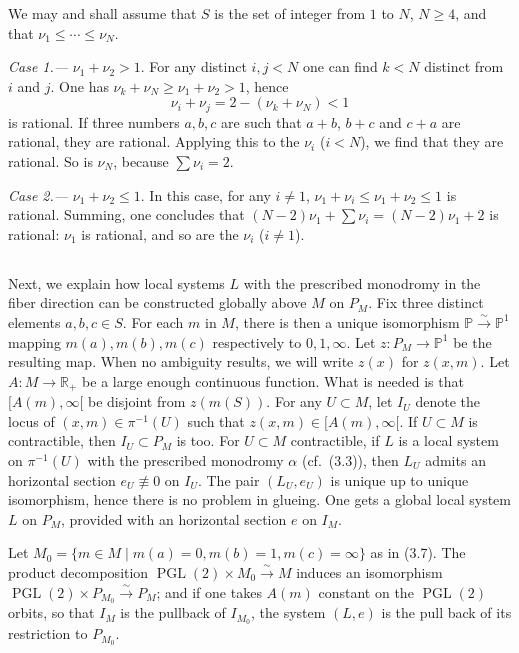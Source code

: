 \documentclass[12pt,a4paper]{article}
\theoremstyle{plain}
\theoremstyle{definition}
\theoremstyle{remark}
\DeclareMathOperator{\PGL}{PGL}
\newcommand{\PP}{\mathbb{P}}
\newcommand{\RR}{\mathbb{R}}
\numberwithin{equation}{section}
\providecommand{\PP}{\mathbb{P}}
\providecommand{\RR}{\mathbb{R}}
\providecommand{\PGL}{\operatorname{PGL}}
\begin{document}
We may and shall assume that $S$ is the set of integer from $1$ to $N$, $N \geq 4$, and that $\nu_1 \leq \cdots \leq \nu_N$.

\textit{Case 1.---} $\nu_1 + \nu_2 > 1$. For any distinct $i, j < N$ one can find $k < N$ distinct from $i$ and $j$. One has $\nu_k + \nu_N \geq \nu_1 + \nu_2 > 1$, hence
\[
\nu_i + \nu_j = 2 - (\nu_k + \nu_N) < 1
\]
is rational. If three numbers $a, b, c$ are such that $a+b$, $b+c$ and $c+a$ are rational, they are rational. Applying this to the $\nu_i$ ($i < N$), we find that they are rational. So is $\nu_N$, because $\sum \nu_i = 2$.

\textit{Case 2.---} $\nu_1 + \nu_2 \leq 1$. In this case, for any $i \neq 1$, $\nu_1 + \nu_i \leq \nu_1 + \nu_2 \leq 1$ is rational. Summing, one concludes that $(N-2)\nu_1 + \sum \nu_i = (N-2)\nu_1 + 2$ is rational: $\nu_1$ is rational, and so are the $\nu_i$ ($i \neq 1$).

\subsection{}
Next, we explain how local systems $L$ with the prescribed monodromy in the fiber direction can be constructed globally above $M$ on $P_M$. Fix three distinct elements $a, b, c \in S$. For each $m$ in $M$, there is then a unique isomorphism $\PP \xrightarrow{\sim} \PP^1$ mapping $m(a), m(b), m(c)$ respectively to $0, 1, \infty$. Let $z: P_M \to \PP^1$ be the resulting map. When no ambiguity results, we will write $z(x)$ for $z(x, m)$. Let $A: M \to \RR_+$ be a large enough continuous function. What is needed is that $[A(m), \infty[$ be disjoint from $z(m(S))$. For any $U \subset M$, let $I_U$ denote the locus of $(x, m) \in \pi^{-1}(U)$ such that $z(x, m) \in [A(m), \infty[$. If $U \subset M$ is contractible, then $I_U \subset P_M$ is too. For $U \subset M$ contractible, if $L$ is a local system on $\pi^{-1}(U)$ with the prescribed monodromy $\alpha$ (cf.\ (3.3)), then $L_U$ admits an horizontal section $e_U \not\equiv 0$ on $I_U$. The pair $(L_U, e_U)$ is unique up to unique isomorphism, hence there is no problem in glueing. One gets a global local system $L$ on $P_M$, provided with an horizontal section $e$ on $I_M$.

Let $M_0 = \{m \in M \mid m(a) = 0, m(b) = 1, m(c) = \infty\}$ as in (3.7). The product decomposition $\PGL(2) \times M_0 \xrightarrow{\sim} M$ induces an isomorphism $\PGL(2) \times P_{M_0} \xrightarrow{\sim} P_M$; and if one takes $A(m)$ constant on the $\PGL(2)$ orbits, so that $I_M$ is the pullback of $I_{M_0}$, the system $(L, e)$ is the pull back of its restriction to $P_{M_0}$.
\end{document}
